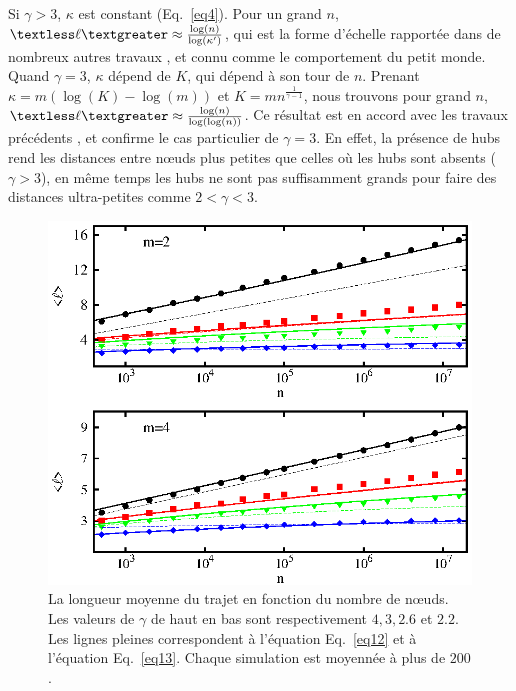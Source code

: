 Si $\gamma>3$, $\kappa$ est constant (Eq.~\ref{eq4}). Pour un grand $n$, $\textless\ell\textgreater\approx\frac{\log(n)} {\log (\kappa')}$, qui est la forme d'échelle rapportée dans de nombreux autres travaux \cite{Bollobas1985,Chung-Lu2002,Fronczak-al2004,Hofstad-al2004,Cohen-Havlin2009}, et connu comme le comportement du petit monde. \\
Quand $\gamma=3$, $\kappa$ dépend de $K$, qui dépend à son tour de $n$. Prenant $\kappa=m(\log(K)-\log(m))$ et $K=mn^{\frac{1}{\gamma-1}}$, nous trouvons pour grand $n$, $\textless\ell\textgreater\approx \frac{\log(n)} {\log(\log(n))} $. Ce résultat est en accord avec les travaux précédents \cite {Chung-Lu2002,Cohen-Havlin2003,Fronczak-al2004,Bollobas-Riodan2002}, et confirme le cas particulier de $ \gamma = 3 $. En effet, la présence de hubs rend les distances entre nœuds plus petites que celles où les hubs sont absents ($\gamma>3$), en même temps les hubs ne sont pas suffisamment grands pour faire des distances ultra-petites comme $2<\gamma<3$.

\begin{figure}[h]
	\centering
	\includegraphics[scale=1.2]{./figures/fig4-3}
	\caption{La longueur moyenne du trajet en fonction du nombre de nœuds. Les valeurs de $\gamma$ de haut en bas sont respectivement $ 4, 3, 2.6 $ et $ 2.2 $. Les lignes pleines correspondent à l'équation Eq.~\ref{eq12} et à l'équation Eq.~\ref{eq13}. Chaque simulation est moyennée à plus de $200 $.}
	\label{fig4-3}
\end{figure}  
 
